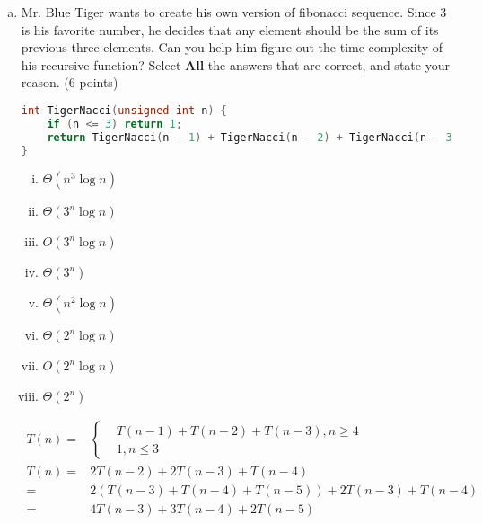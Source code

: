 \documentclass[11pt]{exam}
\begin{document}
\begin{enumerate}[(a)]
    \item Mr. Blue Tiger wants to create his own version of fibonacci sequence. Since 3 is his favorite number, he decides that any element should be the sum of its previous three elements. Can you help him figure out the time complexity of his recursive function? Select \textbf{All} the answers that are correct, and state your reason. (6 points)
          \begin{lstlisting}[language=c++]
int TigerNacci(unsigned int n) {
	if (n <= 3) return 1;
	return TigerNacci(n - 1) + TigerNacci(n - 2) + TigerNacci(n - 3);
}
\end{lstlisting}
          \begin{enumerate}[i)]
              \item $\Theta(n^{3}\log n)$
              \item $\Theta(3^{n}\log n)$
              \item $O(3^{n}\log n)$
              \item $\Theta(3^{n})$
              \item $\Theta(n^{2}\log n)$
              \item $\Theta(2^{n}\log n)$
              \item $O(2^{n}\log n)$
              \item $\Theta(2^{n})$
          \end{enumerate}
          \begin{solution}
              \begin{align*}
                  T(n)=                 & \begin{cases}     & T(n-1)+T(n-2)+T(n-3), n \geq 4 \\
                  & 1 ,n \leq 3
                                          \end{cases}            \\
                  T(n) =                & 2T(n-2)+2T(n-3)+T(n-4)                                        \\ =&
                  2(T(n-3)+T(n-4)+T(n-5))+2T(n-3)+T(n-4)                                                \\=&
                  4T(n-3)+3T(n-4)+2T(n-5)                                                               \\

\end{align*}
\end{solution}
\end{enumerate}
\end{document}
